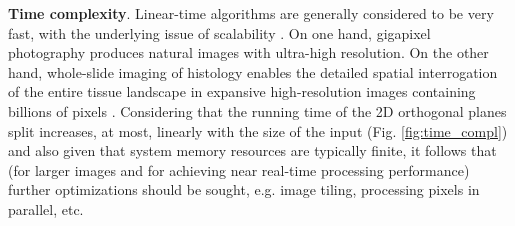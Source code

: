 \documentclass[superscriptaddress,longbibliography,aps,prl,twocolumn,10pt]{revtex4-2}
\begin{document}
\noindent
\textbf{Time complexity}. Linear-time algorithms are generally considered to be very fast, with the underlying issue of scalability \cite{Havill2020}. On one hand, gigapixel photography produces natural images with ultra-high resolution. On the other hand, whole-slide imaging of histology enables the detailed spatial interrogation of the entire tissue landscape in expansive high-resolution images containing billions of pixels \cite{Valous2020}. Considering that the running time of the 2D orthogonal planes split increases, at most, linearly with the size of the input (Fig. \ref{fig:time_compl}) and also given that system memory resources are typically finite, it follows that (for larger images and for achieving near real-time processing performance) further optimizations should be sought, e.g. image tiling, processing pixels in parallel, etc.
\parskip=5pt
\end{document}
